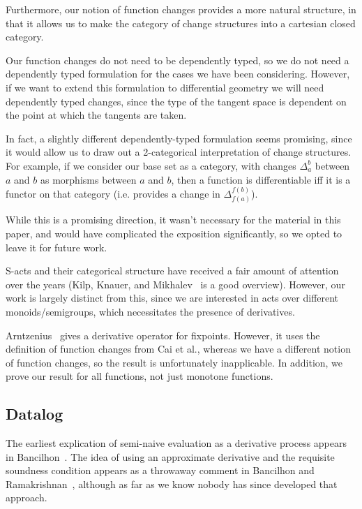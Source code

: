 Furthermore, our notion of function changes provides a more natural structure,
in that it allows us to make the category of change structures into a cartesian
closed category.

Our function changes do not need to be dependently typed, so we do not need a
dependently typed formulation for the cases we have been considering. However,
if we want to extend this formulation to differential geometry we will need
dependently typed changes, since the type of the tangent space is
dependent on the point at which the tangents are taken.

In fact, a slightly different dependently-typed formulation seems promising, since it would allow us
to draw out a 2-categorical interpretation of change structures. For example, if
we consider our base set as a category, with changes $\Delta_a^b$ between $a$
and $b$ as morphisms between $a$ and $b$, then a function is
differentiable iff it is a functor on that category (i.e. provides a change in
$\Delta_{f(a)}^{f(b)}$). 

While this is a promising direction, it wasn't necessary for the material in
this paper, and would have complicated the exposition significantly, so we opted
to leave it for future work.

S-acts and their categorical structure have received a fair amount of attention
over the years (Kilp, Knauer, and Mikhalev~\cite{kilp2000monoids} is a good overview). However, our work
is largely distinct from this, since we are interested in acts over different
monoids/semigroups, which necessitates the presence of derivatives.

Arntzenius~\cite{arntz2017fixpoints} gives a derivative operator for fixpoints. However,
it uses the definition of function changes from Cai et al., whereas
we have a different notion of function changes, so the result is unfortunately
inapplicable. In addition, we prove our result for all functions, not just
monotone functions.

\subsection{Datalog}

The earliest explication of semi-naive evaluation as a derivative process
appears in Bancilhon~\cite{bancilhon1986naive}. The idea of using an approximate derivative
and the requisite soundness condition appears as a throwaway comment in
Bancilhon and Ramakrishnan~\cite{bancilhon1986amateur}, although as far as we know nobody has since
developed that approach. 

